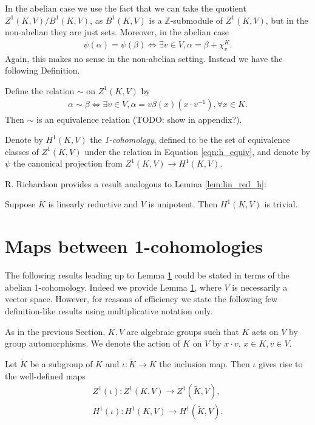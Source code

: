 In the abelian case we use the fact that we can take the quotient $Z^1(K, V)/B^1(K, V)$, as $B^1(K, V)$ is a $\mathbb{Z}$-submodule of $Z^1(K, V)$, but in the non-abelian they are just sets. Moreover, in the abelian case
\begin{align*}
	\psi(\alpha) = \psi(\beta) \Leftrightarrow \exists v \in V, \alpha = \beta + \chi^K_v.
\end{align*}
Again, this makes no sense in the non-abelian setting. Instead we have the following Definition.

\begin{definition} Define the relation $\sim$ on $Z^1(K, V)$ by
	\begin{align}
		\alpha \sim \beta \Leftrightarrow \exists v \in V, \alpha = v\beta(x)(x \cdot v^{-1}), \forall x \in K.
		\label{eqn:h_equiv}
	\end{align}
Then $\sim$ is an equivalence relation (TODO: show in appendix?).

Denote by $H^1(K, V)$ the \emph{1-cohomology}, defined to be the set of equivalence classes of $Z^1(K, V)$ under the relation in Equation \ref{eqn:h_equiv}, and denote by $\psi$ the canonical projection from $Z^1(K, V) \rightarrow H^1(K, V)$.
\end{definition}

R. Richardson \cite[Lemma 6.2.6]{richardson1982orbits} provides a result analogous to Lemma \ref{lem:lin_red_h}:
\begin{lemma}
  Suppose $K$ is linearly reductive and $V$ is unipotent. Then $H^1(K, V)$ is trivial.
  \label{lem:nonab_lin_red}
\end{lemma}

\section{Maps between 1-cohomologies}

The following results leading up to Lemma \ref{} could be stated in terms of the abelian 1-cohomology. Indeed we provide Lemma \ref{}, where $V$ is necessarily a vector space. However, for reasons of efficiency we state the following few definition-like results using multiplicative notation only.

As in the previous Section, $K, V$ are algebraic groups such that $K$ acts on $V$ by group automorphisms. We denote the action of $K$ on $V$ by $x \cdot v$, $x \in K, v \in V$.



\begin{example}
Let $\tilde{K}$ be a subgroup of $K$ and $\iota:\tilde{K}\rightarrow K$ the inclusion map. Then $\iota$ gives rise to the well-defined maps
\begin{align*}
  Z^1(\iota): Z^1(K, V) \rightarrow Z^1(\tilde{K}, V), \\
H^1(\iota):H^1(K, V)\rightarrow H^1(\tilde{K}, V).
\end{align*}
\end{example}

